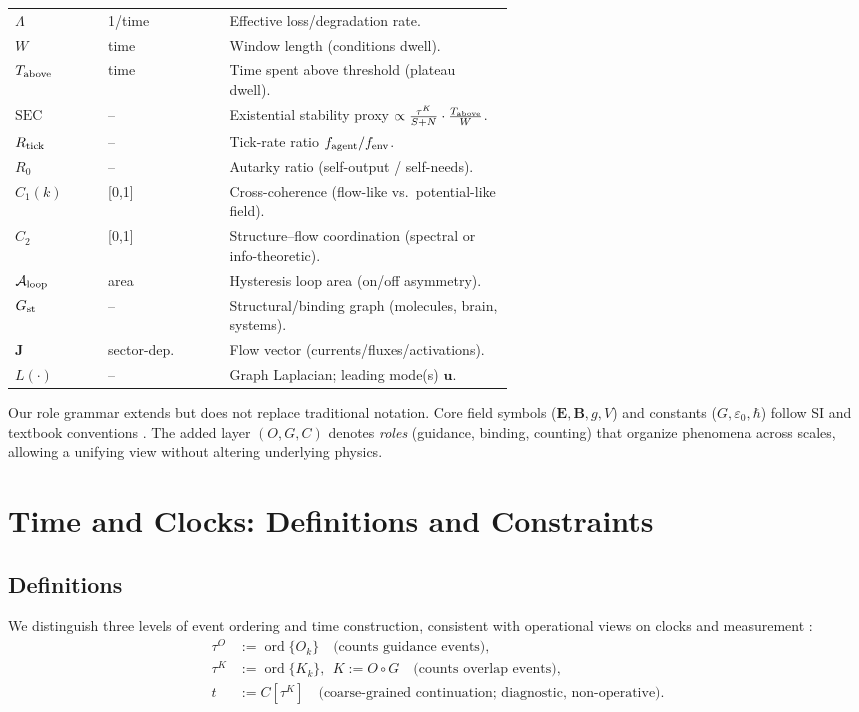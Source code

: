 \documentclass[12pt,a4paper,oneside]{scrreprt}
\begin{document}
\begin{table}[htbp]
\begin{tabular}{llp{0.58\linewidth}}
$\Lambda$ & 1/time & Effective loss/degradation rate.\\
$W$ & time & Window length (conditions dwell).\\
$T_{\rm above}$ & time & Time spent above threshold (plateau dwell).\\
$\mathrm{SEC}$ & – & Existential stability proxy $\propto \frac{\tau^K}{S+N}\cdot\frac{T_{\rm above}}{W}$.\\
$R_{\rm tick}$ & – & Tick-rate ratio $f_{\rm agent}/f_{\rm env}$.\\
$R_0$ & – & Autarky ratio (self-output / self-needs).\\
$C_1(k)$ & [0,1] & Cross-coherence (flow-like vs.\ potential-like field).\\
$C_2$ & [0,1] & Structure–flow coordination (spectral or info-theoretic).\\
$\mathcal A_{\rm loop}$ & area & Hysteresis loop area (on/off asymmetry).\\
$G_{\rm st}$ & – & Structural/binding graph (molecules, brain, systems).\\
$\mathbf J$ & sector-dep. & Flow vector (currents/fluxes/activations).\\
$L(\cdot)$ & – & Graph Laplacian; leading mode(s) $\mathbf u$.\\
\bottomrule
\end{tabular}
\end{table}

\begin{remark}
Our role grammar extends but does not replace traditional notation. 
Core field symbols ($\mathbf{E}, \mathbf{B}, g, V$) and constants ($G, \varepsilon_0, \hbar$) follow SI and textbook conventions 
\cite{bipm2019si,jackson1999classical,goldstein2002classical}. 
The added layer $(O,G,C)$ denotes \emph{roles} (guidance, binding, counting) that organize phenomena across scales, 
allowing a unifying view without altering underlying physics.
\end{remark}

\chapter{Time and Clocks: Definitions and Constraints}\label{app:time}

\section*{Definitions}
We distinguish three levels of event ordering and time construction, consistent with operational views on clocks and measurement \cite{smolin2019einstein,rovelli1995relational}:
\begin{align}
\tau^O &:= \operatorname{ord}\{O_k\}\quad\text{(counts guidance events)},\\
\tau^K &:= \operatorname{ord}\{K_k\},\ \ K:=O\!\circ G\quad\text{(counts overlap events)},\\
t &:= C[\tau^K]\quad\text{(coarse-grained continuation; diagnostic, non-operative).}
\end{align}
\end{document}
